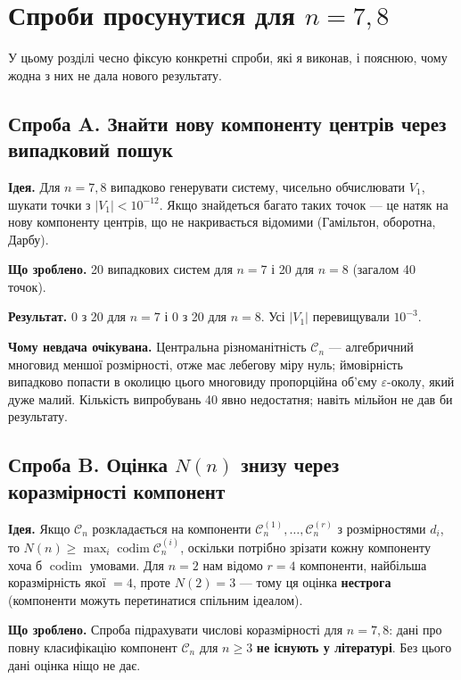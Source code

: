 \documentclass[12pt,a4paper]{article}
\begin{document}
\section{Спроби просунутися для $n=7, 8$}\label{sec:attempts}

У цьому розділі чесно фіксую конкретні спроби, які я виконав, і пояснюю, чому жодна з них не дала нового результату.

\subsection*{Спроба A. Знайти нову компоненту центрів через випадковий пошук}

\textbf{Ідея.} Для $n=7,8$ випадково генерувати систему, чисельно обчислювати $V_1$, шукати точки з $|V_1|<10^{-12}$. Якщо знайдеться багато таких точок --- це натяк на нову компоненту центрів, що не накривається відомими (Гамільтон, оборотна, Дарбу).

\textbf{Що зроблено.} 20 випадкових систем для $n=7$ і 20 для $n=8$ (загалом 40 точок).

\textbf{Результат.} 0 з 20 для $n=7$ і 0 з 20 для $n=8$. Усі $|V_1|$ перевищували $10^{-3}$.

\textbf{Чому невдача очікувана.} Центральна різноманітність $\mathcal{C}_n$ --- алгебричний многовид меншої розмірності, отже має лебегову міру нуль; ймовірність випадково попасти в околицю цього многовиду пропорційна об'єму $\varepsilon$-околу, який дуже малий. Кількість випробувань 40 явно недостатня; навіть мільйон не дав би результату.

\subsection*{Спроба B. Оцінка $N(n)$ знизу через коразмірності компонент}

\textbf{Ідея.} Якщо $\mathcal{C}_n$ розкладається на компоненти $\mathcal{C}_n^{(1)},\dots,\mathcal{C}_n^{(r)}$ з розмірностями $d_i$, то $N(n) \geq \max_i \operatorname{codim}\mathcal{C}_n^{(i)}$, оскільки потрібно зрізати кожну компоненту хоча б $\operatorname{codim}$ умовами. Для $n=2$ нам відомо $r=4$ компоненти, найбільша коразмірність якої $=4$, проте $N(2)=3$ --- тому ця оцінка \textbf{нестрога} (компоненти можуть перетинатися спільним ідеалом).

\textbf{Що зроблено.} Спроба підрахувати числові коразмірності для $n=7,8$: дані про повну класифікацію компонент $\mathcal{C}_n$ для $n\geq 3$ \textbf{не існують у літературі}. Без цього дані оцінка ніщо не дає.
\end{document}
